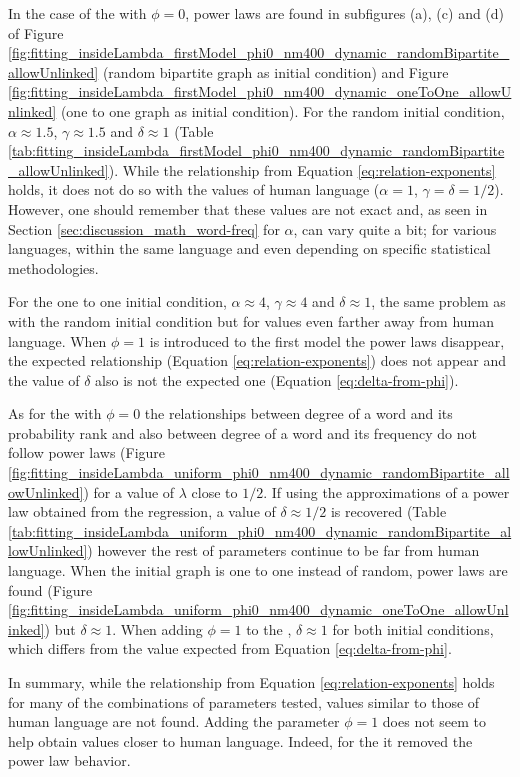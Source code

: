 In the case of the \firstmodel{} with $\phi=0$, power laws are found in subfigures (a), (c) and (d) of Figure \ref{fig:fitting_insideLambda_firstModel_phi0_nm400_dynamic_randomBipartite_allowUnlinked} (random bipartite graph as initial condition) and Figure \ref{fig:fitting_insideLambda_firstModel_phi0_nm400_dynamic_oneToOne_allowUnlinked} (one to one graph as initial condition).
For the random initial condition, $\alpha \approx 1.5$, $\gamma \approx 1.5$ and $\delta \approx 1$ (Table \ref{tab:fitting_insideLambda_firstModel_phi0_nm400_dynamic_randomBipartite_allowUnlinked}). While the relationship from Equation \eqref{eq:relation-exponents} holds, it does not do so with the values of human language ($\alpha=1$, $\gamma=\delta=1/2$).
However, one should remember that these values are not exact and, as seen in Section \ref{sec:discussion_math_word-freq} for $\alpha$, can vary quite a bit; for various languages, within the same language and even depending on specific statistical methodologies.

For the one to one initial condition, $\alpha \approx 4$, $\gamma \approx 4$ and $\delta \approx 1$, the same problem as with the random initial condition but for values even farther away from human language.
When $\phi=1$ is introduced to the first model the power laws disappear, the expected relationship (Equation \eqref{eq:relation-exponents}) does not appear and the value of $\delta$ also is not the expected one (Equation \eqref{eq:delta-from-phi}).

As for the \secondmodel{} with $\phi=0$ the relationships between degree of a word and its probability rank and also between degree of a word and its frequency do not follow power laws (Figure \ref{fig:fitting_insideLambda_uniform_phi0_nm400_dynamic_randomBipartite_allowUnlinked}) for a value of $\lambda$ close to $1/2$.
If using the approximations of a power law obtained from the regression, a value of $\delta \approx 1/2$ is recovered (Table \ref{tab:fitting_insideLambda_uniform_phi0_nm400_dynamic_randomBipartite_allowUnlinked}) however the rest of parameters continue to be far from human language.
When the initial graph is one to one instead of random, power laws are found (Figure \ref{fig:fitting_insideLambda_uniform_phi0_nm400_dynamic_oneToOne_allowUnlinked}) but $\delta \approx 1$.
When adding $\phi=1$ to the \secondmodel{}, $\delta \approx 1$ for both initial conditions, which differs from the value expected from Equation \eqref{eq:delta-from-phi}.

In summary, while the relationship from Equation \eqref{eq:relation-exponents} holds for many of the combinations of parameters tested, values similar to those of human language are not found.
Adding the parameter $\phi=1$ does not seem to help obtain values closer to human language.
Indeed, for the \firstmodel{} it removed the power law behavior.

